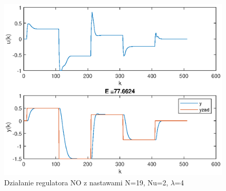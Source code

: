 		\begin{figure}[h!]
			\centering
			\includegraphics[width=0.8\linewidth]{img/strojenieNO_N_19_Nu_2_lam_4.eps}
			\caption{Działanie regulatora NO z nastawami N=19, Nu=2, $\lambda$=4}
			\label{fig:NO}
		\end{figure}
